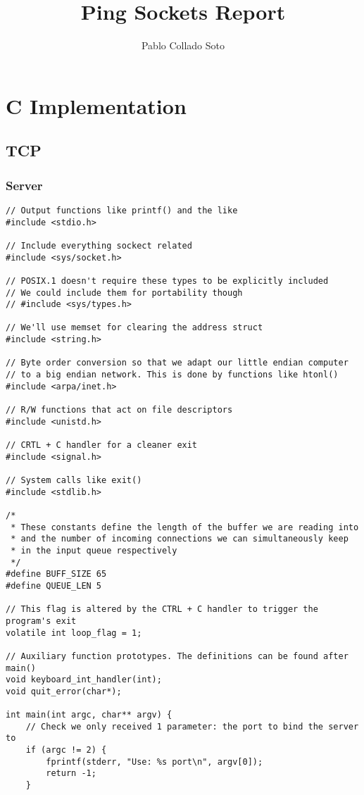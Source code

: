 \documentclass[landscape]{article}
\title{Ping Sockets Report}
\author{Pablo Collado Soto}
\date{}
\begin{document}
    \maketitle

    \section{C Implementation}
        \subsection{TCP}
            \subsubsection{Server}
                \begin{verbatim}
// Output functions like printf() and the like
#include <stdio.h>

// Include everything sockect related
#include <sys/socket.h>

// POSIX.1 doesn't require these types to be explicitly included
// We could include them for portability though
// #include <sys/types.h>

// We'll use memset for clearing the address struct
#include <string.h>

// Byte order conversion so that we adapt our little endian computer
// to a big endian network. This is done by functions like htonl()
#include <arpa/inet.h>

// R/W functions that act on file descriptors
#include <unistd.h>

// CRTL + C handler for a cleaner exit
#include <signal.h>

// System calls like exit()
#include <stdlib.h>

/*
 * These constants define the length of the buffer we are reading into
 * and the number of incoming connections we can simultaneously keep
 * in the input queue respectively
 */
#define BUFF_SIZE 65
#define QUEUE_LEN 5

// This flag is altered by the CTRL + C handler to trigger the program's exit
volatile int loop_flag = 1;

// Auxiliary function prototypes. The definitions can be found after main()
void keyboard_int_handler(int);
void quit_error(char*);

int main(int argc, char** argv) {
    // Check we only received 1 parameter: the port to bind the server to
    if (argc != 2) {
        fprintf(stderr, "Use: %s port\n", argv[0]);
        return -1;
    }


\end{verbatim}
\end{document}
